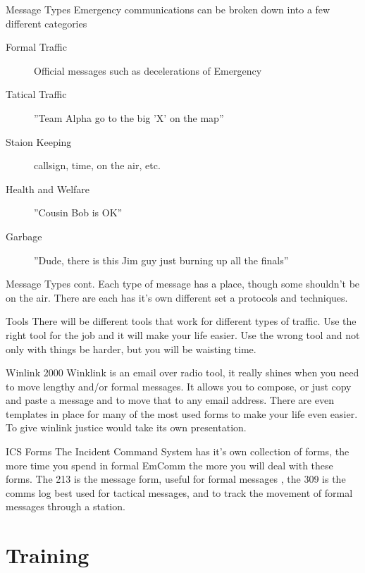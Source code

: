 \documentclass[11pt]{beamer}
\begin{document}
\begin{frame}{Message Types}
Emergency communications can be broken down into a few different categories
\begin{description}
	\item[Formal Traffic] Official messages such as decelerations of Emergency
	\item[Tatical Traffic] ''Team Alpha go to the big 'X' on the map''
	\item[Staion Keeping] callsign, time, on the air, etc.
	\item[Health and Welfare] ''Cousin Bob is OK''
	\item[Garbage] ''Dude, there is this Jim guy just burning up all the finals''
\end{description}
\end{frame}

\begin{frame}{Message Types cont.}
	Each type of message has a place, though some shouldn't be on the air. There are each has it's own different set a protocols and techniques.
\end{frame}

\begin{frame}{Tools}
There will be different tools that work for different types of traffic. Use the right tool for the job and it will make your life easier. Use the wrong tool and not only with things be harder, but you will be waisting time.
\end{frame}

\begin{frame}{Winlink 2000}
Winklink is an email over radio tool, it really shines when you need to move lengthy and/or formal messages. It allows you to compose, or just copy and paste a message and to move that to any email address. There are even templates in place for many of the most used forms to make your life even easier. To give winlink justice would take its own presentation.
\end{frame}

\begin{frame}{ICS Forms}
The Incident Command System has it's own collection of forms, the more time you spend in formal EmComm the more you will deal with these forms. The 213 is the message form, useful for formal messages , the 309 is the comms log best used for tactical messages, and to track the movement of formal messages through a station.
\end{frame}

\section{Training}
\end{document}
